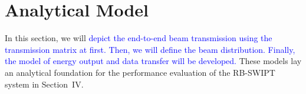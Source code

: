 \documentclass{IEEEtran}
\begin{document}
\section{Analytical  Model}\label{Smechanism}
In this section, we will \textcolor{blue}{depict the end-to-end beam transmission using the transmission matrix at first. Then, we will define the beam distribution. Finally, the model of energy output and data transfer will be developed.}
These models lay an analytical foundation for the performance evaluation of the RB-SWIPT system in Section~IV.
\end{document}
